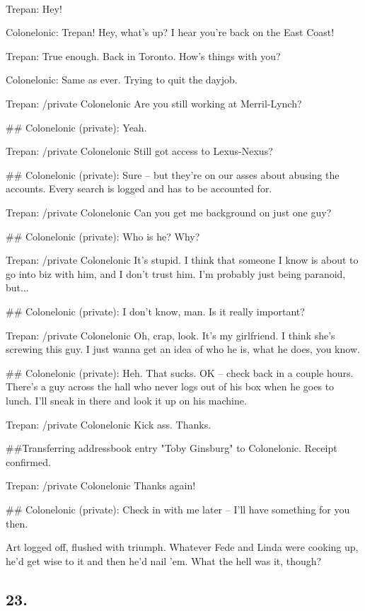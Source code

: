 {\raggedright
\tt
\addtolength{\parskip}{0.5\baselineskip}

Trepan: Hey!

Colonelonic: Trepan! Hey, what's up? I hear you're back on the East
Coast!

Trepan: True enough. Back in Toronto. How's things with you?

Colonelonic: Same as ever. Trying to quit the dayjob.

Trepan: /private Colonelonic Are you still working at
Merril-Lynch?

\#\# Colonelonic (private): Yeah.

Trepan: /private Colonelonic Still got access to Lexus-Nexus?

\#\# Colonelonic (private): Sure -- but they're on our asses about
abusing the accounts. Every search is logged and has to be
accounted for.

Trepan: /private Colonelonic Can you get me background on just one
guy?

\#\# Colonelonic (private): Who is he? Why?

Trepan: /private Colonelonic It's stupid. I think that someone I
know is about to go into biz with him, and I don't trust him. I'm
probably just being paranoid, but...

\#\# Colonelonic (private): I don't know, man. Is it really
important?

Trepan: /private Colonelonic Oh, crap, look. It's my girlfriend. I
think she's screwing this guy. I just wanna get an idea of who he
is, what he does, you know.

\#\# Colonelonic (private): Heh. That sucks. OK -- check back in a
couple hours. There's a guy across the hall who never logs out of
his box when he goes to lunch. I'll sneak in there and look it up
on his machine.

Trepan: /private Colonelonic Kick ass. Thanks.

\#\#Transferring addressbook entry "Toby Ginsburg" to Colonelonic.
Receipt confirmed.

Trepan: /private Colonelonic Thanks again!

\#\# Colonelonic (private): Check in with me later -- I'll have
something for you then.

}

Art logged off, flushed with triumph. Whatever Fede and Linda were
cooking up, he’d get wise to it and then he’d nail ’em. What the
hell was it, though?

\subsection{23.}

